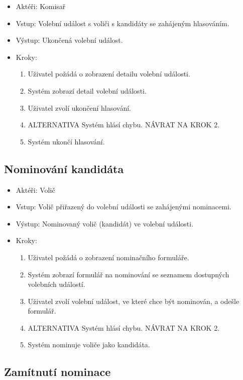 \documentclass[11pt,twoside,a4paper]{book}
\begin{document}
\begin{itemize}
\item Aktéři: Komisař
\item Vstup: Volební událost s voliči s kandidáty se zahájeným hlasováním.
\item Výstup: Ukončená volební událost.
\item Kroky:
	\begin{enumerate}
		\item Uživatel požádá o zobrazení detailu volební události.
		\item Systém zobrazí detail volební události.
		\item Uživatel zvolí ukončení hlasování.		
		\item ALTERNATIVA Systém hlásí chybu. NÁVRAT NA KROK 2.
		\item Systém ukončí hlasování.
	\end{enumerate}
\end{itemize}

\subsection{Nominování kandidáta}

\begin{itemize}
\item Aktéři: Volič
\item Vstup: Volič přiřazený do volební události se zahájenými nominacemi.
\item Výstup: Nominovaný volič (kandidát) ve volební události.
\item Kroky:
	\begin{enumerate}
		\item Uživatel požádá o zobrazení nominačního formuláře.
		\item Systém zobrazí formulář na nominování se seznamem dostupných volebních událostí.
		\item Uživatel zvolí volební událost, ve které chce být nominován, a odešle formulář.		
		\item ALTERNATIVA Systém hlásí chybu. NÁVRAT NA KROK 2.
		\item Systém nominuje voliče jako kandidáta.
	\end{enumerate}
\end{itemize}

\subsection{Zamítnutí nominace}
\end{document}
